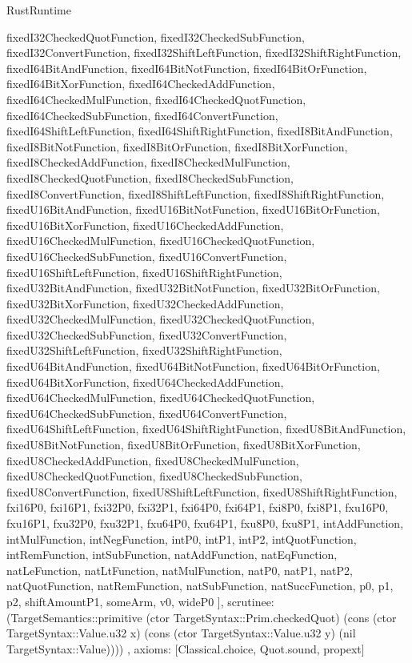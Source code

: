 \begin{lexlean}{RustRuntime}
\begin{semanticmodule}
{{      fixedI32CheckedQuotFunction,
      fixedI32CheckedSubFunction,
      fixedI32ConvertFunction,
      fixedI32ShiftLeftFunction,
      fixedI32ShiftRightFunction,
      fixedI64BitAndFunction,
      fixedI64BitNotFunction,
      fixedI64BitOrFunction,
      fixedI64BitXorFunction,
      fixedI64CheckedAddFunction,
      fixedI64CheckedMulFunction,
      fixedI64CheckedQuotFunction,
      fixedI64CheckedSubFunction,
      fixedI64ConvertFunction,
      fixedI64ShiftLeftFunction,
      fixedI64ShiftRightFunction,
      fixedI8BitAndFunction,
      fixedI8BitNotFunction,
      fixedI8BitOrFunction,
      fixedI8BitXorFunction,
      fixedI8CheckedAddFunction,
      fixedI8CheckedMulFunction,
      fixedI8CheckedQuotFunction,
      fixedI8CheckedSubFunction,
      fixedI8ConvertFunction,
      fixedI8ShiftLeftFunction,
      fixedI8ShiftRightFunction,
      fixedU16BitAndFunction,
      fixedU16BitNotFunction,
      fixedU16BitOrFunction,
      fixedU16BitXorFunction,
      fixedU16CheckedAddFunction,
      fixedU16CheckedMulFunction,
      fixedU16CheckedQuotFunction,
      fixedU16CheckedSubFunction,
      fixedU16ConvertFunction,
      fixedU16ShiftLeftFunction,
      fixedU16ShiftRightFunction,
      fixedU32BitAndFunction,
      fixedU32BitNotFunction,
      fixedU32BitOrFunction,
      fixedU32BitXorFunction,
      fixedU32CheckedAddFunction,
      fixedU32CheckedMulFunction,
      fixedU32CheckedQuotFunction,
      fixedU32CheckedSubFunction,
      fixedU32ConvertFunction,
      fixedU32ShiftLeftFunction,
      fixedU32ShiftRightFunction,
      fixedU64BitAndFunction,
      fixedU64BitNotFunction,
      fixedU64BitOrFunction,
      fixedU64BitXorFunction,
      fixedU64CheckedAddFunction,
      fixedU64CheckedMulFunction,
      fixedU64CheckedQuotFunction,
      fixedU64CheckedSubFunction,
      fixedU64ConvertFunction,
      fixedU64ShiftLeftFunction,
      fixedU64ShiftRightFunction,
      fixedU8BitAndFunction,
      fixedU8BitNotFunction,
      fixedU8BitOrFunction,
      fixedU8BitXorFunction,
      fixedU8CheckedAddFunction,
      fixedU8CheckedMulFunction,
      fixedU8CheckedQuotFunction,
      fixedU8CheckedSubFunction,
      fixedU8ConvertFunction,
      fixedU8ShiftLeftFunction,
      fixedU8ShiftRightFunction,
      fxi16P0,
      fxi16P1,
      fxi32P0,
      fxi32P1,
      fxi64P0,
      fxi64P1,
      fxi8P0,
      fxi8P1,
      fxu16P0,
      fxu16P1,
      fxu32P0,
      fxu32P1,
      fxu64P0,
      fxu64P1,
      fxu8P0,
      fxu8P1,
      intAddFunction,
      intMulFunction,
      intNegFunction,
      intP0,
      intP1,
      intP2,
      intQuotFunction,
      intRemFunction,
      intSubFunction,
      natAddFunction,
      natEqFunction,
      natLeFunction,
      natLtFunction,
      natMulFunction,
      natP0,
      natP1,
      natP2,
      natQuotFunction,
      natRemFunction,
      natSubFunction,
      natSuccFunction,
      p0,
      p1,
      p2,
      shiftAmountP1,
      someArm,
      v0,
      wideP0
    ],
    scrutinee: (TargetSemantics::primitive (ctor TargetSyntax::Prim.checkedQuot) (cons (ctor TargetSyntax::Value.u32 x) (cons (ctor TargetSyntax::Value.u32 y) (nil TargetSyntax::Value))))
  },
  axioms: [Classical.choice, Quot.sound, propext]
}


\end{semanticmodule}
\end{lexlean}
